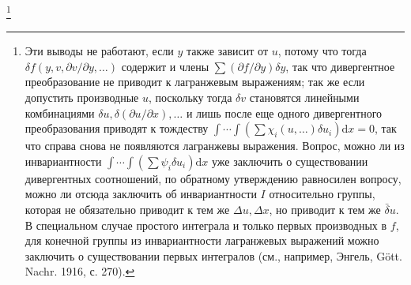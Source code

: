 \documentclass[11pt]{article}
\providecommand{\D}{\Delta}
\providecommand{\p}{\partial}
\providecommand{\dd}{\mathrm d}
\providecommand{\bd}{\bar{\delta}}
\begin{document}
\footnote{Эти выводы не работают, если \(y\) также зависит от \(u\), потому что тогда \(\delta f(y,v,\p v/\p y,\ldots)\) содержит и члены \(\sum(\p f/\p y)\delta y\), так что дивергентное преобразование не приводит к лагранжевым выражениям; так же если допустить производные \(u\), поскольку тогда \(\delta v\) становятся линейными комбинациями \(\delta u,\delta(\p u/\p x),\ldots\) и лишь после еще одного дивергентного преобразования приводят к тождеству \(\int\!\cdots\!\int(\sum\chi_i(u,\ldots)\delta u_i)\dd x=0\), так что справа снова не появляются лагранжевы выражения. Вопрос, можно ли из инвариантности \(\int\!\cdots\!\int(\sum\psi_i\delta u_i)\dd x\) уже заключить о существовании дивергентных соотношений, по обратному утверждению равносилен вопросу, можно ли отсюда заключить об инвариантности \(I\) относительно группы, которая не обязательно приводит к тем же \(\D u,\D x\), но приводит к тем же \(\bd u\). В специальном случае простого интеграла и только первых производных в \(f\), для конечной группы из инвариантности лагранжевых выражений можно заключить о существовании первых интегралов (см., например, Энгель, Gött. Nachr. 1916, с. 270).}
\end{document}
